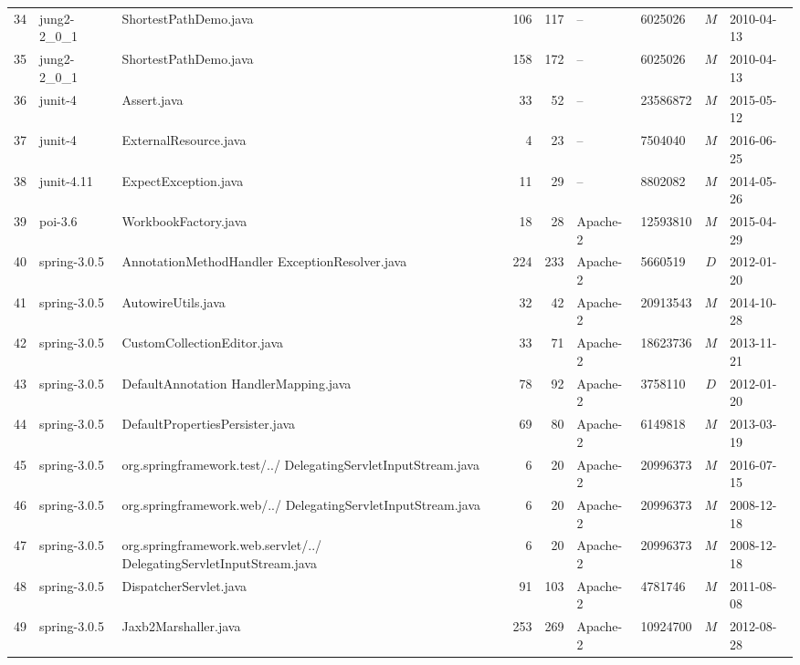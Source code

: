 \documentclass{sig-alternate-05-2015}
\begin{document}
\begin{table}
\begin{tabular}{r|l|p{4.5cm}|r|r|l|l|c|l}
			34 & jung2-2\_0\_1  & ShortestPathDemo.java  & 106 & 117 & -- & 6025026 & $M$  & 2010-04-13 \\
			35 & jung2-2\_0\_1  & ShortestPathDemo.java  & 158 & 172 & -- & 6025026 & $M$  & 2010-04-13 \\
			36 & junit-4  & Assert.java  & 33 & 52 & -- & 23586872 & $M$  & 2015-05-12 \\
			37 & junit-4  & ExternalResource.java  & 4 & 23 & -- & 7504040 & $M$  & 2016-06-25 \\
			38 & junit-4.11  & ExpectException.java  & 11 & 29 & -- & 8802082 & $M$  & 2014-05-26 \\
			39 & poi-3.6  & WorkbookFactory.java  & 18 & 28 & Apache-2 & 12593810 & $M$  & 2015-04-29 \\
			40 & spring-3.0.5  & AnnotationMethodHandler \newline ExceptionResolver.java  & 224 & 233 & Apache-2 & 5660519 & $D$  & 2012-01-20 \\
			41 & spring-3.0.5  & AutowireUtils.java  & 32 & 42 & Apache-2 & 20913543 & $M$  & 2014-10-28 \\
			42 & spring-3.0.5  & CustomCollectionEditor.java  & 33 & 71 & Apache-2 & 18623736 & $M$  & 2013-11-21 \\
			43 & spring-3.0.5  & DefaultAnnotation \newline HandlerMapping.java  & 78 & 92 & Apache-2 & 3758110 & $D$  & 2012-01-20 \\
			44 & spring-3.0.5  & DefaultPropertiesPersister.java  & 69 & 80 & Apache-2 & 6149818 & $M$  & 2013-03-19 \\
			45 & spring-3.0.5  & org.springframework.test/../ \newline DelegatingServletInputStream.java  & 6 & 20 & Apache-2 & 20996373 & $M$  & 2016-07-15 \\
			46 & spring-3.0.5  & org.springframework.web/../ \newline DelegatingServletInputStream.java  & 6 & 20 & Apache-2 & 20996373 & $M$  & 2008-12-18 \\
			47 & spring-3.0.5  & org.springframework.web.servlet/../ \newline DelegatingServletInputStream.java  & 6 & 20 & Apache-2 & 20996373 & $M$  & 2008-12-18 \\
			48 & spring-3.0.5  & DispatcherServlet.java  & 91 & 103 & Apache-2 & 4781746 & $M$  & 2011-08-08 \\
			49 & spring-3.0.5  & Jaxb2Marshaller.java  & 253 & 269 & Apache-2 & 10924700 & $M$  & 2012-08-28 \\

\end{tabular}
\end{table}
\end{document}
